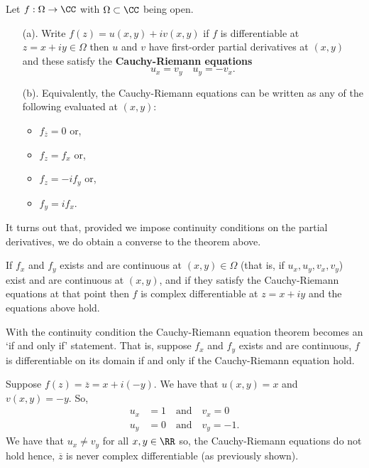 \documentclass[12pt, a4paper]{article}
\begin{document}
\begin{mdthm}
    Let \(f : \Omega \to \CC\) with \(\Omega \subset \CC\) being open.
    \begin{enumerate}
        \item[(a).] Write \(f(z) = u(x,y)+i v(x,y)\) if \(f\) is differentiable at \(z = x+iy \in \Omega\) then \(u\) and \(v\) have first-order partial derivatives at \((x,y)\) and these satisfy the \textbf{Cauchy-Riemann equations}
        \[u_x = v_y \quad u_y = -v_x.\]
        \item[(b).] Equivalently, the Cauchy-Riemann equations can be written as any of the following evaluated at \((x,y)\):
        \begin{itemize}
            \item \(f_{\overline{z}}=0\) or,
            \item \(f_z=f_x\) or,
            \item \(f_z=-i f_y\) or,
            \item \(f_y=if_x\).
        \end{itemize}
    \end{enumerate}
\end{mdthm}

\begin{mdnote}
    It turns out that, provided we impose continuity conditions on the partial derivatives, we do obtain a converse to the theorem above.
\end{mdnote}

\begin{mdthm}
    If \(f_x\) and \(f_y\) exists and are continuous at \((x,y) \in \Omega\) (that is, if \(u_x,u_y,v_x,v_y\)) exist and are continuous at \((x,y)\), and if they satisfy the Cauchy-Riemann equations at that point then \(f\) is complex differentiable at \(z = x+iy\) and the equations above hold. 
\end{mdthm}

\begin{mdnote}
    With the continuity condition the Cauchy-Riemann equation theorem becomes an `if and only if' statement. That is, suppose \(f_x\) and \(f_y\) exists and are continuous, \(f\) is differentiable on its domain if and only if the Cauchy-Riemann equation hold.
\end{mdnote}

\begin{example}
    Suppose \(f(z)=\overline{z} = x+i(-y)\). We have that \(u(x,y)=x\) and \(v(x,y)=-y\). So, 
    \[\begin{aligned}
        u_x &=1 \quad \text{and} \quad v_x =0 \\
        u_y &=0 \quad \text{and} \quad v_y = -1.
    \end{aligned}\]
    We have that \(u_x \neq v_y\) for all \(x,y \in \RR\) so, the Cauchy-Riemann equations do not hold hence, \(\overline{z}\) is never complex differentiable (as previously shown). 
\end{example}
\end{document}
